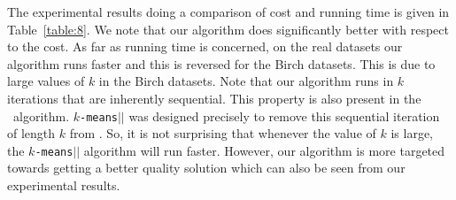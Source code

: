 The experimental results doing a comparison of cost and running time is given in Table~\ref{table:8}.
We note that our algorithm does significantly better with respect to the cost. 
As far as running time is concerned, on the real datasets our algorithm runs faster and this is reversed for the Birch datasets. 
This is due to large values of $k$ in the Birch datasets.
Note that our algorithm runs in $k$ iterations that are inherently sequential. 
This property is also present in the \kmpp\ algorithm.
{\tt $k$-means$||$} was designed precisely to remove this sequential iteration of length $k$ from \kmpp.
So, it is not surprising that whenever the value of $k$ is large, the {\tt $k$-means$||$} algorithm will run faster. 
However, our algorithm is more targeted towards getting a better quality solution which can also be seen from our experimental results.



